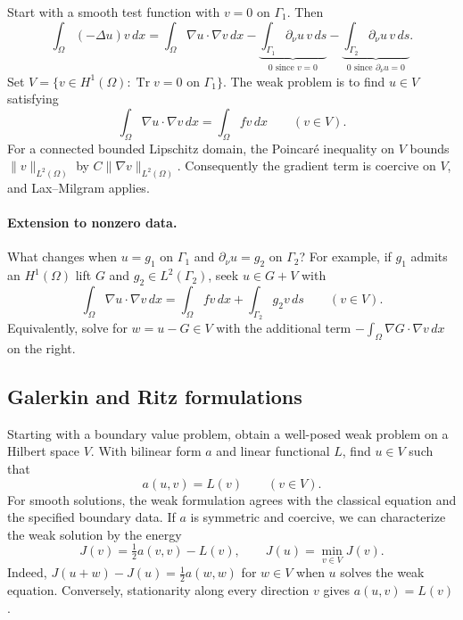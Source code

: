 \documentclass[11pt,a4paper]{article}
\begin{document}
\begin{center}
\end{center}

Start with a smooth test function with \(v=0\) on \(\Gamma_1\). Then
\[
 \int_\Omega(-\Delta u)v\,dx
 =\int_\Omega\nabla u\cdot\nabla v\,dx
   -\underbrace{\int_{\Gamma_1}\partial_\nu u\,v\,ds}_{0\text{ since }v=0}
   -\underbrace{\int_{\Gamma_2}\partial_\nu u\,v\,ds}_{0\text{ since }\partial_\nu u=0}.
\]
Set \(V=\{v\in H^1(\Omega):\operatorname{Tr}v=0\text{ on }\Gamma_1\}\).
The weak problem is to find \(u\in V\) satisfying
\[
 \int_\Omega\nabla u\cdot\nabla v\,dx=\int_\Omega fv\,dx
 \qquad (v\in V).
\]
For a connected bounded Lipschitz domain, the Poincar\'e inequality on
\(V\) bounds \(\|v\|_{L^2(\Omega)}\) by \(C\|\nabla v\|_{L^2(\Omega)}\).
Consequently the gradient term is coercive on \(V\), and Lax--Milgram applies.

\paragraph{Extension to nonzero data.}
What changes when \(u=g_1\) on \(\Gamma_1\) and
\(\partial_\nu u=g_2\) on \(\Gamma_2\)? For example, if \(g_1\) admits an
\(H^1(\Omega)\) lift \(G\) and \(g_2\in L^2(\Gamma_2)\), seek \(u\in G+V\)
with
\[
 \int_\Omega\nabla u\cdot\nabla v\,dx
  =\int_\Omega fv\,dx+\int_{\Gamma_2}g_2v\,ds\qquad (v\in V).
\]
Equivalently, solve for \(w=u-G\in V\) with the additional term
\(-\int_\Omega\nabla G\cdot\nabla v\,dx\) on the right.

\subsection{Galerkin and Ritz formulations}

Starting with a boundary value problem, obtain a well-posed weak problem
on a Hilbert space \(V\). With bilinear form \(a\) and linear functional \(L\),
find \(u\in V\) such that
\[
 a(u,v)=L(v)\qquad (v\in V).
\]
For smooth solutions, the weak formulation agrees with the classical
equation and the specified boundary data. If \(a\) is symmetric and
coercive, we can characterize the weak solution by the energy
\[
 J(v)=\tfrac12 a(v,v)-L(v),\qquad J(u)=\min_{v\in V}J(v).
\]
Indeed, \(J(u+w)-J(u)=\tfrac12 a(w,w)\) for \(w\in V\) when \(u\) solves
the weak equation. Conversely, stationarity along every direction \(v\)
gives \(a(u,v)=L(v)\).
\end{document}
